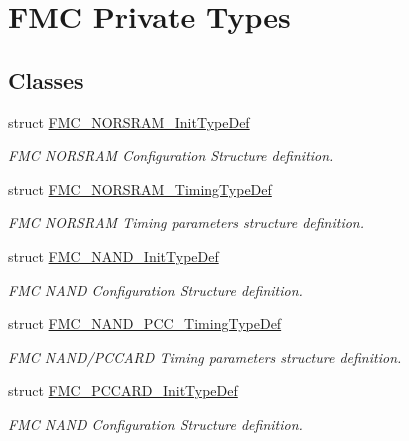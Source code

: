\hypertarget{group___f_m_c___l_l___private___types}{}\section{F\+MC Private Types}
\label{group___f_m_c___l_l___private___types}
\subsection*{Classes}
\begin{DoxyCompactItemize}
\item 
struct \hyperlink{struct_f_m_c___n_o_r_s_r_a_m___init_type_def}{F\+M\+C\+\_\+\+N\+O\+R\+S\+R\+A\+M\+\_\+\+Init\+Type\+Def}
\begin{DoxyCompactList}\small\item\em F\+MC N\+O\+R\+S\+R\+AM Configuration Structure definition. \end{DoxyCompactList}\item 
struct \hyperlink{struct_f_m_c___n_o_r_s_r_a_m___timing_type_def}{F\+M\+C\+\_\+\+N\+O\+R\+S\+R\+A\+M\+\_\+\+Timing\+Type\+Def}
\begin{DoxyCompactList}\small\item\em F\+MC N\+O\+R\+S\+R\+AM Timing parameters structure definition. \end{DoxyCompactList}\item 
struct \hyperlink{struct_f_m_c___n_a_n_d___init_type_def}{F\+M\+C\+\_\+\+N\+A\+N\+D\+\_\+\+Init\+Type\+Def}
\begin{DoxyCompactList}\small\item\em F\+MC N\+A\+ND Configuration Structure definition. \end{DoxyCompactList}\item 
struct \hyperlink{struct_f_m_c___n_a_n_d___p_c_c___timing_type_def}{F\+M\+C\+\_\+\+N\+A\+N\+D\+\_\+\+P\+C\+C\+\_\+\+Timing\+Type\+Def}
\begin{DoxyCompactList}\small\item\em F\+MC N\+A\+N\+D/\+P\+C\+C\+A\+RD Timing parameters structure definition. \end{DoxyCompactList}\item 
struct \hyperlink{struct_f_m_c___p_c_c_a_r_d___init_type_def}{F\+M\+C\+\_\+\+P\+C\+C\+A\+R\+D\+\_\+\+Init\+Type\+Def}
\begin{DoxyCompactList}\small\item\em F\+MC N\+A\+ND Configuration Structure definition. \end{DoxyCompactList}\item 

\end{DoxyCompactItemize}
